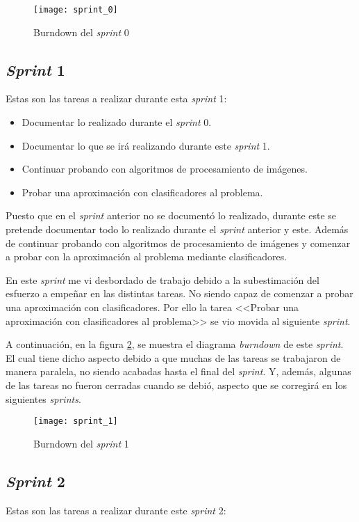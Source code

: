 \begin{figure}[h]
\centering
\texttt{[image: sprint\_0]}
\caption{Burndown del \textit{sprint} 0}
\label{fig:A.1.1}
\end{figure}

\subsection{\textit{Sprint} 1}
Estas son las tareas a realizar durante esta \textit{sprint} 1:

\begin{itemize}
	\item Documentar lo realizado durante el \textit{sprint} 0.
	\item Documentar lo que se irá realizando durante este \textit{sprint} 1.
	\item Continuar probando con algoritmos de procesamiento de imágenes.
	\item Probar una aproximación con clasificadores al problema.
\end{itemize}

Puesto que en el \textit{sprint} anterior no se documentó lo realizado, durante este se pretende documentar todo lo realizado durante el \textit{sprint} anterior y este. Además de continuar probando con algoritmos de procesamiento de imágenes y comenzar a probar con la aproximación al problema mediante clasificadores.

En este \textit{sprint} me vi desbordado de trabajo debido a la subestimación del esfuerzo a empeñar en las distintas tareas. No siendo capaz de comenzar a probar una aproximación con clasificadores. Por ello la tarea <<Probar una aproximación con clasificadores al problema>> se vio movida al siguiente \textit{sprint}. 

A continuación, en la figura \ref{fig:A.1.2}, se muestra el diagrama \textit{burndown} de este \textit{sprint}. El cual tiene dicho aspecto debido a que muchas de las tareas se trabajaron de manera paralela, no siendo acabadas hasta el final del \textit{sprint}. Y, además, algunas de las tareas no fueron cerradas cuando se debió, aspecto que se corregirá en los siguientes \textit{sprints}.

\begin{figure}
\centering
\texttt{[image: sprint\_1]}
\caption{Burndown del \textit{sprint} 1}
\label{fig:A.1.2}
\end{figure}

\subsection{\textit{Sprint} 2}
Estas son las tareas a realizar durante este \textit{sprint} 2:


